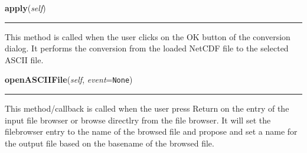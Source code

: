     \vspace{0.5ex}

\hspace{.8\funcindent}\begin{boxedminipage}{\funcwidth}

    \raggedright \textbf{apply}(\textit{self})

    \vspace{-1.5ex}

    \rule{\textwidth}{0.5\fboxrule}
\setlength{\parskip}{2ex}
    This method is called when the user clicks on the OK button of the 
    conversion dialog. It performs the conversion from the loaded NetCDF 
    file to the selected ASCII file.

\setlength{\parskip}{1ex}
    \end{boxedminipage}

    \label{nMOLDYN:GUI:ASCIIToNetCDFConversionDialog:ASCIIToNetCDFConversionDialog:openASCIIFile}

    \vspace{0.5ex}

\hspace{.8\funcindent}\begin{boxedminipage}{\funcwidth}

    \raggedright \textbf{openASCIIFile}(\textit{self}, \textit{event}={\tt None})

    \vspace{-1.5ex}

    \rule{\textwidth}{0.5\fboxrule}
\setlength{\parskip}{2ex}
    This method/callback is called when the user press Return on the entry 
    of the input file browser or browse directlry from the file browser. It
    will set the filebrowser entry to the name of the browsed file and 
    propose and set a name for the output file based on the basename of the
    browsed file.

\setlength{\parskip}{1ex}
    \end{boxedminipage}

